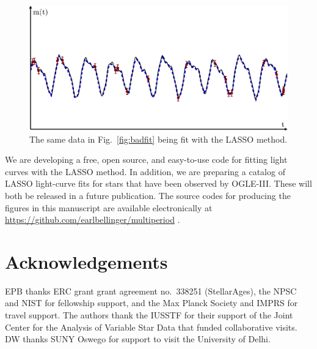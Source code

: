 \documentclass[11pt,twoside]{book}
\begin{document}
\begin{figure}[!t]
    \centering
    \includegraphics[width=\textwidth]{bellinger-fig2.eps}
    \caption{The same data in Fig.~\ref{fig:badfit} being fit with the LASSO method.}%
    \label{fig:goodfit} 
\end{figure}

We are developing a free, open source, and easy-to-use code for fitting light curves with the LASSO method. In addition, we are preparing a catalog of LASSO light-curve fits for stars that have been observed by OGLE-III. These will both be released in a future publication. The source codes for producing the figures in this manuscript are available electronically at \url{https://github.com/earlbellinger/multiperiod} \citep{bellinger2015lasso}.

\section*{Acknowledgements}
EPB thanks ERC grant grant agreement no.~338251 (StellarAges), the NPSC and NIST for fellowship support, and the Max Planck Society and IMPRS for travel support. The authors thank the IUSSTF for their support of the Joint Center for the Analysis of Variable Star Data that funded collaborative visits. DW thanks SUNY Oswego for support to visit the University of Delhi. 
\end{document}
